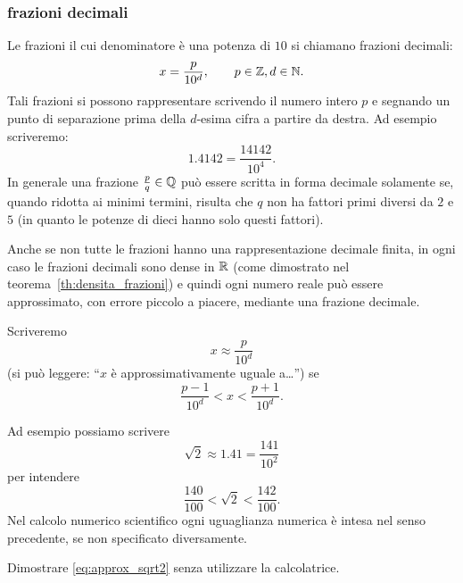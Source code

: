 \subsubsection{frazioni decimali}
%
Le frazioni il cui denominatore è una potenza
di $10$ si chiamano frazioni decimali:
\[
  x = \frac{p}{10^d}, \qquad p\in {\mathbb Z}, d\in {\mathbb N}.
\]
Tali frazioni si possono rappresentare
scrivendo il numero
intero $p$ e segnando un punto
%
di separazione
prima della $d$-esima cifra a partire da destra.
Ad esempio scriveremo:
\[
  1.4142 = \frac{14142}{10^4}.
\]
In generale una frazione $\frac{p}{q}\in {\mathbb Q}$
può essere scritta in forma decimale solamente
se, quando ridotta ai minimi termini,
risulta che $q$ non ha fattori primi diversi
da $2$ e $5$ (in quanto le potenze di dieci
hanno solo questi fattori).

Anche se non tutte le frazioni hanno una rappresentazione 
decimale finita, in ogni caso le frazioni decimali 
sono dense in ${\mathbb R}$ (come dimostrato nel teorema~\ref{th:densita_frazioni})
e quindi ogni numero reale può essere approssimato, con errore piccolo a piacere,
mediante una frazione decimale.

Scriveremo
\mymargin{$\approx$}%
\index{$\approx$}%
\[
  x \approx \frac{p}{10^d}
\]
(si può leggere: ``$x$ è approssimativamente uguale a\dots'')
se
\[
    \frac{p-1}{10^d} < x < \frac{p+1}{10^d}.
\]

Ad esempio possiamo scrivere
\[
  \sqrt 2 \approx 1.41 = \frac{141}{10^2}
\]
per intendere%
%
\begin{equation}\label{eq:approx_sqrt2}
\frac{140}{100} < \sqrt 2 < \frac{142}{100}.
\end{equation}
Nel calcolo numerico scientifico ogni uguaglianza numerica è intesa nel 
senso precedente, se non specificato diversamente. 

\begin{exercise}
Dimostrare \ref{eq:approx_sqrt2} senza 
utilizzare la calcolatrice.
\end{exercise}

